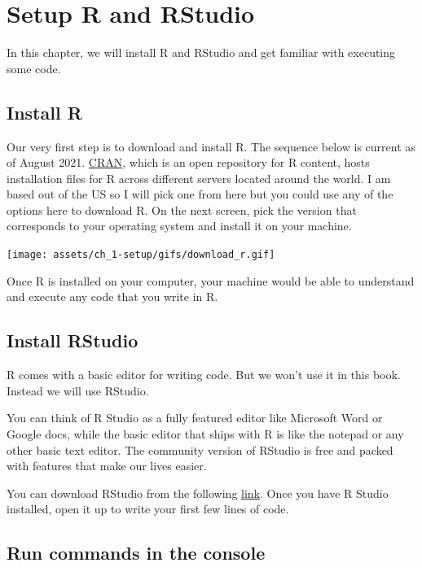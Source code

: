 \documentclass[
]{book}
\begin{document}
\hypertarget{setup}{%
\chapter{Setup R and RStudio}\label{setup}}

In this chapter, we will install R and RStudio and get familiar with executing some code.

\hypertarget{install-r}{%
\section{Install R}\label{install-r}}

Our very first step is to download and install R. The sequence below is current as of August 2021. \href{https://cran.r-project.org/}{CRAN}, which is an open repository for R content, hosts installation files for R across different servers located around the world. I am based out of the US so I will pick one from here but you could use any of the options here to download R. On the next screen, pick the version that corresponds to your operating system and install it on your machine.

\texttt{[image: assets/ch\_1-setup/gifs/download\_r.gif]}

Once R is installed on your computer, your machine would be able to understand and execute any code that you write in R.

\hypertarget{install-rstudio}{%
\section{Install RStudio}\label{install-rstudio}}

R comes with a basic editor for writing code. But we won't use it in this book. Instead we will use RStudio.

You can think of R Studio as a fully featured editor like Microsoft Word or Google docs, while the basic editor that ships with R is like the notepad or any other basic text editor. The community version of RStudio is free and packed with features that make our lives easier.

You can download RStudio from the following \href{https://www.rstudio.com/products/rstudio/download/\#download}{link}. Once you have R Studio installed, open it up to write your first few lines of code.

\hypertarget{run-commands-in-the-console}{%
\section{Run commands in the console}\label{run-commands-in-the-console}}
\end{document}

